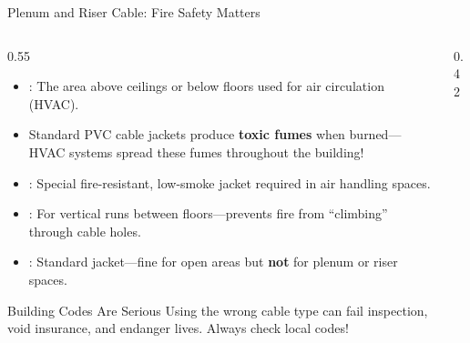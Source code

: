 \documentclass[aspectratio=169]{beamer}  %
\begin{document}
\begin{frame}{Plenum and Riser Cable: Fire Safety Matters}
    \begin{columns}[T]
        \begin{column}{0.55\textwidth}
            \begin{itemize}
                \small
                \item {}: The area above ceilings or below floors used for air circulation (HVAC).
                \item Standard PVC cable jackets produce \textbf{toxic fumes} when burned---HVAC systems spread these fumes throughout the building!
                \item {}: Special fire-resistant, low-smoke jacket required in air handling spaces.
                \item {}: For vertical runs between floors---prevents fire from ``climbing'' through cable holes.
                \item {}: Standard jacket---fine for open areas but \textbf{not} for plenum or riser spaces.
            \end{itemize}
            
            \vspace{0.3em}
            \begin{alertblock}{Building Codes Are Serious}
                \scriptsize
                Using the wrong cable type can fail inspection, void insurance, and endanger lives. Always check local codes!
            \end{alertblock}
        \end{column}
        \begin{column}{0.42\textwidth}
            \begin{center}
\end{center}
\end{column}
\end{columns}
\end{frame}
\end{document}

